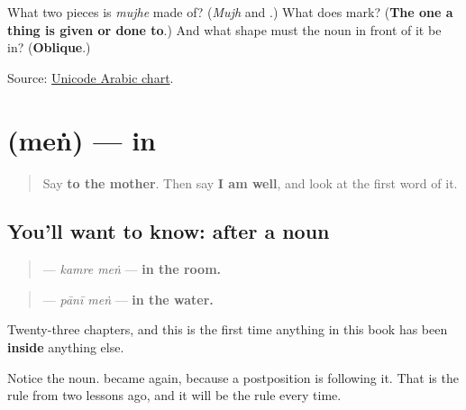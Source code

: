 \begin{tcolorbox}[breakable,colback=teal!4,colframe=teal!35!black,title={Before you move on}]
What two pieces is \emph{mujhe} made of? (\emph{Mujh} and \textbf{}.) What does \textbf{} mark? (\textbf{The one a thing is given or done to}.) And what shape must the noun in front of it be in? (\textbf{Oblique}.)

Source: \href{https://www.unicode.org/charts/PDF/U0600.pdf}{Unicode Arabic chart}.
\end{tcolorbox}
\section[\texorpdfstring{\ur{میں} (meṅ)}{میں (meṅ)}]{ (meṅ) — in}

\label{lesson:UR-C23-mein}



\begin{quote}
Say \textbf{to the mother}. Then say \textbf{I am well}, and look at the first word of it.
\end{quote}

\subsection*{You'll want to know:  after a noun}
\begin{quote}
\textbf{ } — \emph{kamre meṅ} — \textbf{in the room.}
\end{quote}

\begin{quote}
\textbf{ } — \emph{pānī meṅ} — \textbf{in the water.}
\end{quote}

Twenty-three chapters, and this is the first time anything in this book has been \textbf{inside} anything else.

Notice the noun. \textbf{} became \textbf{} again, because a postposition is following it. That is the rule from two lessons ago, and it will be the rule every time.

